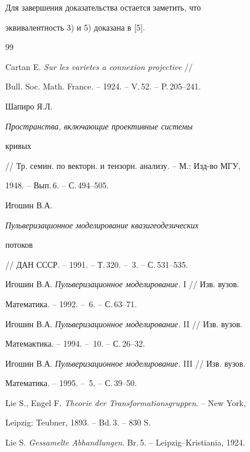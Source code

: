 Для завершения доказательства остается заметить, что


эквивалентность 3) и 5) доказана в [5].








\begin{thebibliography}{99}







Cartan E. {\em Sur les varietes a connexion projective} //


Bull. Soc. Math. France. -- 1924. -- V.\,52. -- P.\,205--241.




Шапиро Я.Л. {\em Пространства, включающие проективные системы


кривых} // Тр. семин. по векторн. и тензорн. анализу. -- М.: Изд-во МГУ,


1948. -- Вып.\,6. -- С.\,494--505.




Игошин В.А. {\em Пульверизационное моделирование квазигеодезических


потоков} // ДАН СССР. -- 1991. -- Т.\,320. -- \No\,3. -- С.\,531--535.




Игошин В.А. {\em Пульверизационное моделирование.} I // Изв. вузов.


Математика. -- 1992. -- \No\,6. -- С.\,63--71.




Игошин В.А. {\em Пульверизационное моделирование.} II // Изв. вузов.


Матемактика. -- 1994. -- \No\,10. -- С.\,26--32.




Игошин В.А. {\em Пульверизационное моделирование.} III // Изв. вузов.


Математика. -- 1995. -- \No\,5. -- С.\,39--50.




Lie S., Engel F. {\em Theorie der Transformationsgruppen}. -- New York,


Leipzig: Teubner, 1893. -- Bd.\,3. -- 830 S.




Lie S. {\em Gessamelte Abhandlungen}. Br.\,5. -- Leipzig--Kristiania, 1924.





\end{thebibliography}
